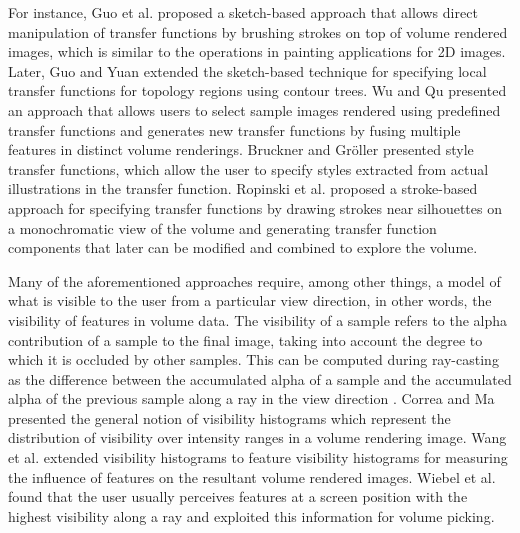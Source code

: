 \documentclass[twoside,twocolumn,10pt]{article}
\begin{document}

For instance, Guo et al. \cite{guo_wysiwyg_2011} proposed a sketch-based approach that allows direct manipulation of transfer functions by brushing strokes on top of volume rendered images, which is similar to the operations in painting applications for 2D images.
Later, Guo and Yuan \cite{guo_local_2013} extended the sketch-based technique for specifying local transfer functions for topology regions using contour trees.
Wu and Qu \cite{wu_interactive_2007} presented an approach that allows users to select sample images rendered using predefined transfer functions and generates new transfer functions by fusing multiple features in distinct volume renderings.
Bruckner and Gr{\"o}ller \cite{bruckner_style_2007} presented style transfer functions, which allow the user to specify styles extracted from actual illustrations in the transfer function.
Ropinski et al. \cite{ropinski_stroke-based_2008} proposed a stroke-based approach for specifying transfer functions by drawing strokes near silhouettes on a monochromatic view of the volume and generating transfer function components \cite{castro_transfer_1998} that later can be modified and combined to explore the volume.


Many of the aforementioned approaches require, among other things, a model of what is visible to the user from a particular view direction, in other words, the visibility of features in volume data.
The visibility of a sample refers to the alpha contribution of a sample to the final image, taking into account the degree to which it is occluded by other samples. This can be computed during ray-casting as the difference between the accumulated alpha of a sample and the accumulated alpha of the previous sample along a ray in the view direction \cite{emsenhuber_visibility_2008}.
Correa and Ma presented the general notion of visibility histograms \cite{correa_visibility_2011} which represent the distribution of visibility over intensity ranges in a volume rendering image.
Wang et al. \cite{wang_efficient_2011} extended visibility histograms to feature visibility histograms for measuring the influence of features on the resultant volume rendered images.
Wiebel et al. \cite{wiebel_wysiwyp:_2012} found that the user usually perceives features at a screen position with the highest visibility along a ray and exploited this information for volume picking.
\end{document}
